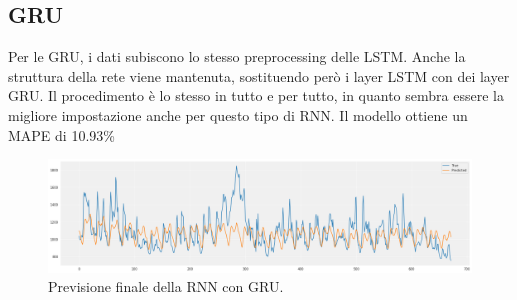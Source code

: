 \subsection{GRU}

Per le GRU, i dati subiscono lo stesso preprocessing delle LSTM. Anche la struttura della rete viene mantenuta, sostituendo però i layer LSTM con dei layer GRU. Il procedimento è lo stesso in tutto e per tutto, in quanto sembra essere la migliore impostazione anche per questo tipo di RNN. Il modello ottiene un MAPE di 10.93\%

\begin{figure}[H]
\centering
\includegraphics[width=14cm]{Pictures/prediction_gru.png}
\caption{Previsione finale della RNN con GRU.}
\end{figure}


